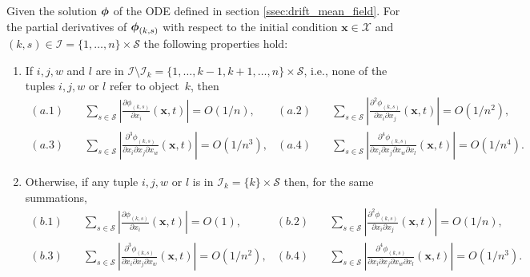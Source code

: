 \documentclass[acmsmall]{acmart}
\newcommand\bx{\mathbf{x}}
\newcommand\bphi{\text{\boldmath$\phi$}}
\newcommand\calX{\mathcal{X}}
\newcommand\calI{\mathcal{I}}
\newcommand\calS{\mathcal{S}}
\newcommand\abs[1]{\left|#1\right|}         %
\newcommand{\dddd}[5]{ \frac{\partial^4 #1 }{ \partial x_{#2} \partial x_{#3} \partial x_{#4} \partial x_{#5} }}
\newcommand{\ddd}[4]{ \frac{\partial^3 #1 }{ \partial x_{#2} \partial x_{#3} \partial x_{#4} }}
\newcommand{\dd}[3]{ \frac{\partial^2 #1 }{ \partial x_{#2} \partial x_{#3}}}
\begin{document}
\begin{lemma}
\label{lemma:properties_phi}
Given the solution $\bphi$ of the ODE defined in section \ref{ssec:drift_mean_field}. For the partial derivatives of $\bphi_{(k,s)}$ with respect to the initial condition $\bx \in \calX$ and $(k,s)\in\calI = \{1,\ldots,n\} \times \calS$ the following properties hold:

\begin{enumerate}[label=(\alph*)]
  \item If $i,j,w$ and $l$ are in  $\calI \setminus \calI_k = \{1,\ldots,k-1,k+1,\ldots,n\}\times \calS$, i.e., none of the tuples $i,j,w$ or $l$ refer to object~$k$, then
\begin{align*}
(a.1)\quad& \sum_{s\in\calS} \abs{\frac{\partial \phi_{(k,s)}}{\partial x_{i}}(\bx,t)} = O(1/n),
& (a.2)\quad& \sum_{s\in\calS} \abs{\dd{\phi_{(k,s)}}{i}{j}(\bx,t)} = O(1/n^2), \\
(a.3)\quad& \sum_{s\in\calS} \abs{\ddd{\phi_{(k,s)}}{i}{j}{w}(\bx,t)} = O(1/n^3),
& (a.4)\quad& \sum_{s\in\calS} \abs{\dddd{\phi_{(k,s)}}{i}{j}{w}{l}(\bx,t)} = O(1/n^4).
\end{align*}
  \item Otherwise, if any tuple $i,j,w$ or $l$ is in  $\calI_k= \{k\}\times \calS$ then, for the same summations, 
\begin{align*}
(b.1)\quad& \sum_{s\in\calS} \abs{\frac{\partial \phi_{(k,s)}}{\partial x_{i}}(\bx,t)} = O(1),
& (b.2)\quad& \sum_{s\in\calS} \abs{\dd{\phi_{(k,s)}}{i}{j}(\bx,t)} = O(1/n), \\
(b.3) \quad & \sum_{s\in\calS} \abs{\ddd{\phi_{(k,s)}}{i}{j}{w}(\bx,t)} = O(1/n^2),
& (b.4) \quad& \sum_{s\in\calS} \abs{\dddd{\phi_{(k,s)}}{i}{j}{w}{l}(\bx,t)} = O(1/n^3).
\end{align*}

\end{enumerate}

\end{lemma}
\end{document}
